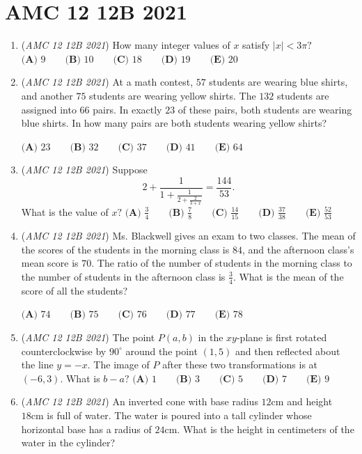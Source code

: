 \section{AMC 12 12B 2021}
        \begin{enumerate}
        	\item (\textit{AMC 12 12B 2021}) How many integer values of $x$ satisfy $|x|<3\pi?$
$\textbf{(A) }9 \qquad \textbf{(B) }10 \qquad \textbf{(C) }18 \qquad \textbf{(D) }19 \qquad \textbf{(E) }20$


	\item (\textit{AMC 12 12B 2021}) At a math contest, $57$ students are wearing blue shirts, and another $75$ students are wearing yellow shirts. The $132$ students are assigned into $66$ pairs. In exactly $23$ of these pairs, both students are wearing blue shirts. In how many pairs are both students wearing yellow shirts?


 $\textbf{(A) }23 \qquad \textbf{(B) }32 \qquad \textbf{(C) }37 \qquad \textbf{(D) }41 \qquad \textbf{(E) }64$


	\item (\textit{AMC 12 12B 2021}) Suppose
 \[2+\frac{1}{1+\frac{1}{2+\frac{2}{3+x}}}=\frac{144}{53}.\]What is the value of $x?$
$\textbf{(A) }\frac34 \qquad \textbf{(B) }\frac78 \qquad \textbf{(C) }\frac{14}{15} \qquad \textbf{(D) }\frac{37}{38} \qquad \textbf{(E) }\frac{52}{53}$


	\item (\textit{AMC 12 12B 2021}) Ms. Blackwell gives an exam to two classes. The mean of the scores of the students in the morning class is $84$, and the afternoon class's mean score is $70$. The ratio of the number of students in the morning class to the number of students in the afternoon class is $\frac34$. What is the mean of the score of all the students?


 $\textbf{(A) }74 \qquad \textbf{(B) }75 \qquad \textbf{(C) }76 \qquad \textbf{(D) }77 \qquad \textbf{(E) }78$


	\item (\textit{AMC 12 12B 2021}) The point $P(a,b)$ in the $xy$-plane is first rotated counterclockwise by $90^\circ$ around the point $(1,5)$ and then reflected about the line $y=-x$. The image of $P$ after these two transformations is at $(-6,3)$. What is $b-a?$
$\textbf{(A) }1 \qquad \textbf{(B) }3 \qquad \textbf{(C) }5 \qquad \textbf{(D) }7 \qquad \textbf{(E) }9$


	\item (\textit{AMC 12 12B 2021}) An inverted cone with base radius $12 \text{cm}$ and height $18\text{cm}$ is full of water. The water is poured into a tall cylinder whose horizontal base has a radius of $24\text{cm}$. What is the height in centimeters of the water in the cylinder?



\end{enumerate}
